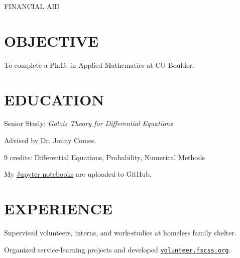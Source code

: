 \documentclass[margin]{res}
\begin{document}
\begin{resume}

\vspace{-50pt}
\begin{flushright}            
    FINANCIAL AID
\end{flushright}

\printheader
\section{OBJECTIVE}

To complete a Ph.D. in Applied Mathematics at CU Boulder.

\section{EDUCATION}

    \begin{details}
        \item Senior Study: \emph{Galois Theory for Differential Equations}
        \item Advised by Dr. Jonny Comes.
    \end{details}

    \begin{details}
        \item 9 credits: Differential Equations, Probability, Numerical Methods 
        \item My \href{https://nbviewer.jupyter.org/github/coltongrainger/notebooks/tree/master/}{Jupyter notebooks} are uploaded to GitHub.
    \end{details}

\section{EXPERIENCE}

    \begin{details}
        \item{Supervised volunteers, interns, and work-studies at homeless family shelter.}
        \item{Organized service-learning projects and developed \href{http://volunteer.fscss.org}{\texttt{volunteer.fscss.org}}.}
    \end{details}


\end{resume}
\end{document}
